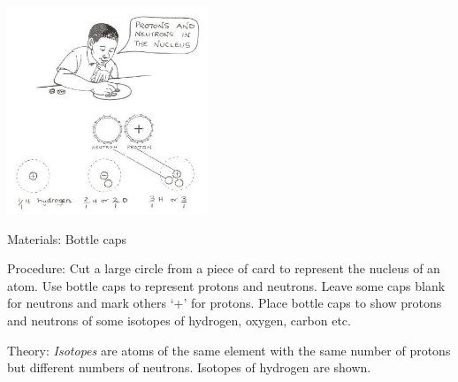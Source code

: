 \begin{multicols}{2}
\begin{center}
\includegraphics[width=0.45\textwidth]{./img/source/isotopes.jpg}
\end{center}

\begin{description*}
\item[Materials:]{Bottle caps}
\item[Procedure:]{Cut a large
circle from a piece of card to represent
the nucleus of an atom. Use bottle caps to represent protons and
neutrons. Leave some caps blank
for neutrons and mark others `+' for protons.
Place bottle caps to show protons and neutrons of some
isotopes of hydrogen, oxygen, carbon etc.}
\item[Theory:]{\emph{Isotopes} are atoms of the same element with the same number of protons but different numbers of neutrons. Isotopes of hydrogen are shown.}
\end{description*}



\end{multicols}

\pagebreak